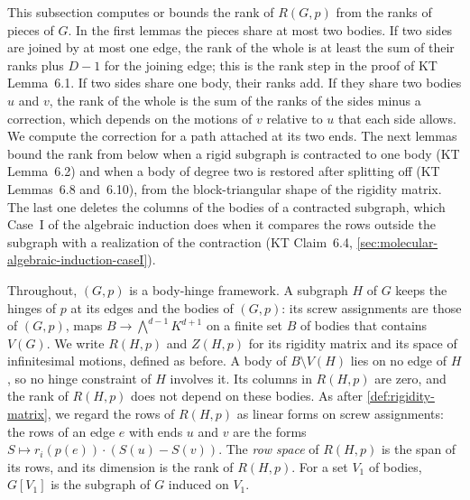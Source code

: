 This subsection computes or bounds the rank of $R(G,p)$ from the ranks
of pieces of $G$. In the first lemmas the pieces share at most two
bodies. If two sides are joined by at most one edge, the
rank of the whole is at least the sum of their ranks plus $D - 1$ for
the joining edge; this is the rank step in the proof of KT Lemma~6.1.
If two sides share one body, their ranks add. If they share two bodies
$u$ and $v$, the rank of the whole is the sum of the ranks of the sides
minus a correction, which depends on the motions of $v$ relative to $u$
that each side allows. We compute the correction for a path attached at
its two ends. The next lemmas bound the rank from below when a rigid
subgraph is contracted to one body (KT Lemma~6.2) and when a body of
degree two is restored after splitting off (KT Lemmas~6.8 and~6.10),
from the block-triangular shape of the rigidity matrix. The last one
deletes the columns of the bodies of a contracted subgraph, which Case~I
of the algebraic induction does when it compares the rows outside the
subgraph with a realization of the contraction (KT Claim~6.4,
\cref{sec:molecular-algebraic-induction-caseI}).

Throughout, $(G,p)$ is a body-hinge framework. A subgraph $H$ of $G$
keeps the hinges of $p$ at its edges and the bodies of $(G,p)$: its
screw assignments are those of $(G,p)$, maps
$B \to \bigwedge^{d-1}K^{d+1}$ on a finite set $B$ of bodies that
contains $V(G)$. We write $R(H,p)$ and $Z(H,p)$ for its rigidity matrix
and its space of infinitesimal motions, defined as before. A body of
$B \setminus V(H)$ lies on no edge of $H$, so no hinge constraint of $H$
involves it. Its columns in $R(H,p)$ are zero, and the rank of $R(H,p)$
does not depend on these bodies. As after
\cref{def:rigidity-matrix}, we regard the rows of $R(H,p)$ as linear
forms on screw assignments: the rows of an edge $e$ with ends $u$ and
$v$ are the forms $S \mapsto r_i(p(e)) \cdot (S(u) - S(v))$. The
\emph{row space} of $R(H,p)$ is the span of its rows, and its dimension
is the rank of $R(H,p)$. For a set $V_1$ of bodies, $G[V_1]$ is the
subgraph of $G$ induced on $V_1$.

